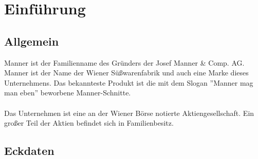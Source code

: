\section{Einführung}
\subsection{Allgemein}
Manner ist der Familienname des Gründers der Josef Manner \& Comp. AG. Manner ist der Name der Wiener Süßwarenfabrik und auch eine Marke dieses Unternehmens. Das bekannteste Produkt ist die mit dem Slogan ''Manner mag man eben'' beworbene Manner-Schnitte. \cite{wiki_manner} \\\\
\noindent
Das Unternehmen ist eine an der Wiener Börse notierte Aktiengesellschaft. Ein großer Teil der Aktien befindet sich in Familienbesitz. \cite{wiki_manner}
\subsection{Eckdaten}
